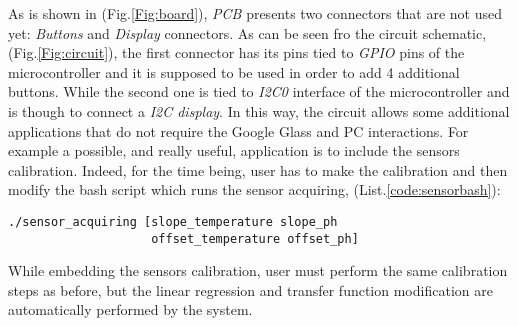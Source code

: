 As is shown in (Fig.\ref{Fig:board}), \textit{PCB} presents two connectors that are not used yet: \textit{Buttons} and \textit{Display} connectors. As can be seen fro the circuit schematic, (Fig.\ref{Fig:circuit}), the first connector has its pins tied to \textit{GPIO} pins of the microcontroller and it is supposed to be used in order to add 4 additional buttons. While the second one is tied to \textit{I2C0} interface of the microcontroller and is though to connect a \textit{I2C display}. In this way, the circuit allows some additional applications that do not require the Google Glass and PC interactions. For example a possible, and really useful, application is to include the sensors calibration. Indeed, for the time being, user has to make the calibration and then modify the bash script which runs the sensor acquiring, (List.\ref{code:sensorbash}):

\begin{lstlisting}[basicstyle=\footnotesize]
./sensor_acquiring [slope_temperature slope_ph 
                    offset_temperature offset_ph]
\end{lstlisting}

While embedding the sensors calibration, user must perform the same calibration steps as before, but the linear regression and transfer function modification  are automatically performed by the system.
